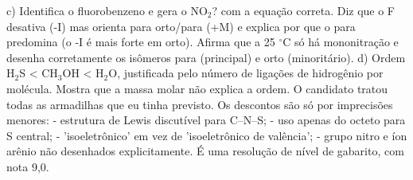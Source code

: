 \documentclass{article}%
\begin{document}
\newline%
c) Identifica o fluorobenzeno e gera o NO$_{2}$? com a equação correta. Diz que o F desativa (-I) mas orienta para orto/para (+M) e explica por que o para predomina (o -I é mais forte em orto). Afirma que a 25 $^\circ$C só há mononitração e desenha corretamente os isômeros para (principal) e orto (minoritário).\newline%
\newline%
d) Ordem H$_{2}$S < CH$_{3}$OH < H$_{2}$O, justificada pelo número de ligações de hidrogênio por molécula. Mostra que a massa molar não explica a ordem.\newline%
\newline%
O candidato tratou todas as armadilhas que eu tinha previsto. Os descontos são só por imprecisões menores:\newline%
{-} estrutura de Lewis discutível para C--N--S;\newline%
{-} uso apenas do octeto para S central;\newline%
{-} 'isoeletrônico' em vez de 'isoeletrônico de valência';\newline%
{-} grupo nitro e íon arênio não desenhados explicitamente.\newline%
\newline%
É uma resolução de nível de gabarito, com nota 9,0.%
\end{document}
